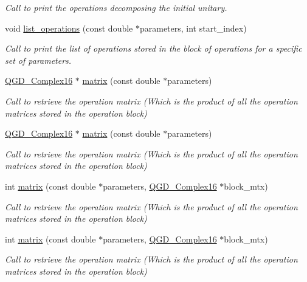 \begin{DoxyCompactItemize}
\begin{DoxyCompactList}\small\item\em Call to print the operations decomposing the initial unitary. \end{DoxyCompactList}\item 
void \hyperlink{class_operation__block_a29e2c74d7fa7344193a17e39248eb803}{list\+\_\+operations} (const double $\ast$parameters, int start\+\_\+index)
\begin{DoxyCompactList}\small\item\em Call to print the list of operations stored in the block of operations for a specific set of parameters. \end{DoxyCompactList}\item 
\hyperlink{struct_q_g_d___complex16}{Q\+G\+D\+\_\+\+Complex16} $\ast$ \hyperlink{class_operation__block_a43cdb87a4ee2a339de30c94cc94fa40e}{matrix} (const double $\ast$parameters)
\begin{DoxyCompactList}\small\item\em Call to retrieve the operation matrix (Which is the product of all the operation matrices stored in the operation block) \end{DoxyCompactList}\item 
\hyperlink{struct_q_g_d___complex16}{Q\+G\+D\+\_\+\+Complex16} $\ast$ \hyperlink{class_operation__block_a916db3ef5d6fcf25367843a1306cd4e0}{matrix} (const double $\ast$parameters)
\begin{DoxyCompactList}\small\item\em Call to retrieve the operation matrix (Which is the product of all the operation matrices stored in the operation block) \end{DoxyCompactList}\item 
int \hyperlink{class_operation__block_abf4287a38eeca35a81163f86a361d95c}{matrix} (const double $\ast$parameters, \hyperlink{struct_q_g_d___complex16}{Q\+G\+D\+\_\+\+Complex16} $\ast$block\+\_\+mtx)
\begin{DoxyCompactList}\small\item\em Call to retrieve the operation matrix (Which is the product of all the operation matrices stored in the operation block) \end{DoxyCompactList}\item 
int \hyperlink{class_operation__block_abf4287a38eeca35a81163f86a361d95c}{matrix} (const double $\ast$parameters, \hyperlink{struct_q_g_d___complex16}{Q\+G\+D\+\_\+\+Complex16} $\ast$block\+\_\+mtx)
\begin{DoxyCompactList}\small\item\em Call to retrieve the operation matrix (Which is the product of all the operation matrices stored in the operation block) \end{DoxyCompactList}\item 

\end{DoxyCompactItemize}
